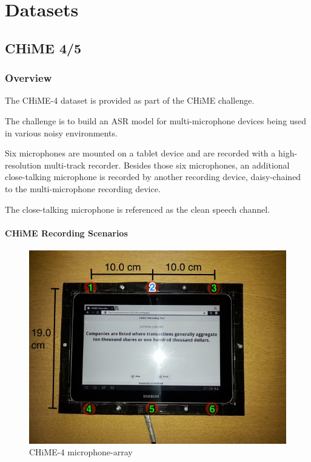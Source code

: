 \chapter{Datasets}\label{ch:datasets}
\section{CHiME 4/5}
\subsection{Overview}
The CHiME-4 dataset is provided 
as part of the CHiME challenge\cite{chimechal,chimebase}.

The challenge is to build an ASR model
for multi-microphone devices being used
in various noisy environments.

Six microphones are mounted on a tablet
device and are recorded with a high-resolution
multi-track recorder. Besides those six 
microphones, an additional 
close-talking microphone is recorded by
another recording device, daisy-chained to the
multi-microphone recording device.

The close-talking microphone is referenced as
the clean speech channel.

\subsubsection{CHiME Recording Scenarios}
\begin{figure}[H]
    \centering
    \includegraphics[width=0.75\linewidth]{Datasets/images/chime4_mic_array}
    \caption{CHiME-4 microphone-array}\label{fig:chime4_mic_array}
\end{figure}

